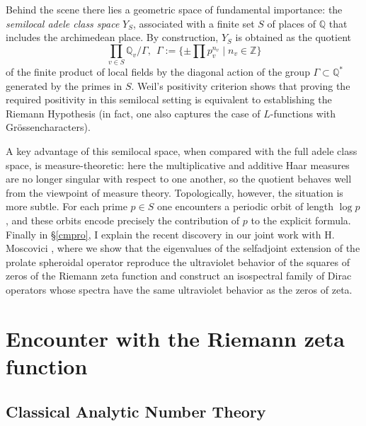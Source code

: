 \documentclass{article}
\def\Q{{\mathbb Q}}
\def\Z{{\mathbb Z}}
\begin{document}
  \newline    
  Behind the scene there lies a geometric space of fundamental importance: 
the \emph{semilocal adele class space} $Y_S$, associated with a finite set 
$S$ of places of $\Q$ that includes the archimedean place. By construction, 
$Y_S$ is obtained as the quotient  
\[
   \prod_{v \in S} \Q_v/\Gamma, \ \ \Gamma:=\{\pm \prod p_v^{n_v}\mid n_v\in \Z\}
\]
of the finite product of local fields by the diagonal action of the group $\Gamma\subset \Q^*$ generated by the primes in $S$. 
Weil's positivity criterion shows that proving the required positivity 
in this semilocal setting is equivalent to establishing the Riemann 
Hypothesis (in fact, one also captures the case of $L$-functions with 
Grössencharacters). 

A key advantage of this semilocal space, when compared with the full adele 
class space, is measure-theoretic: here the multiplicative and additive Haar 
measures are no longer singular with respect to one another, so the quotient 
behaves well from the viewpoint of measure theory. Topologically, however, 
the situation is more subtle. For each prime $p \in S$ one encounters a 
periodic orbit of length $\log p$, and these orbits encode precisely the 
contribution of $p$ to the explicit formula. Finally in \S \ref{cmpro}, I explain the recent discovery in our joint work with H. Moscovici \cite{CM}, where we show that the eigenvalues of the selfadjoint extension  of the prolate spheroidal operator reproduce the ultraviolet behavior of the squares of zeros of the Riemann zeta function and construct an isospectral family of Dirac operators whose spectra have the same ultraviolet behavior as the zeros of zeta.
   







\section{Encounter with the Riemann zeta function}



\subsection{Classical Analytic Number Theory}
\end{document}
